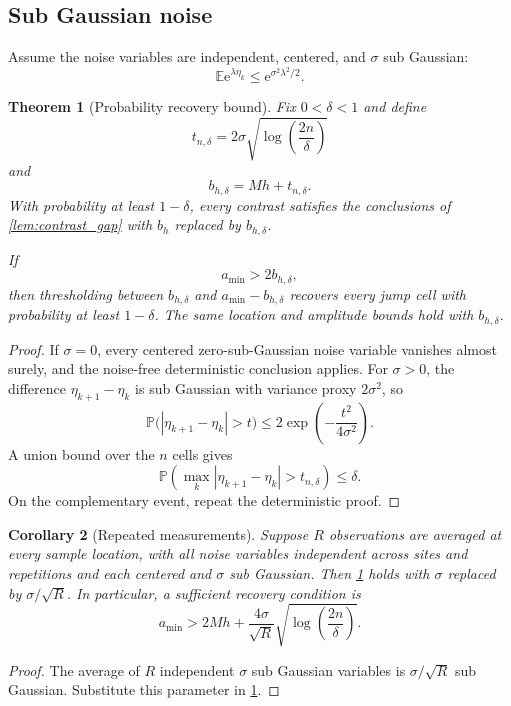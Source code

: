 \documentclass[11pt,a4paper]{article}
\newtheorem{theorem}{Theorem}[section]
\newtheorem{corollary}[theorem]{Corollary}
\theoremstyle{definition}
\theoremstyle{remark}
\newcommand{\e}{\mathrm e}
\begin{document}
\subsection{Sub Gaussian noise}

Assume the noise variables are independent, centered, and \(\sigma\) sub Gaussian:
\[
\mathbb E\e^{\lambda\eta_k}
\leq
\e^{\sigma^2\lambda^2/2}.
\]

\begin{theorem}[Probability recovery bound]\label{thm:probability_recovery}
Fix \(0<\delta<1\) and define
\[
t_{n,\delta}
=
2\sigma
\sqrt{\log\left(\frac{2n}{\delta}\right)}
\]
and
\[
b_{h,\delta}=Mh+t_{n,\delta}.
\]
With probability at least \(1-\delta\), every contrast satisfies the conclusions of \cref{lem:contrast_gap} with \(b_h\) replaced by \(b_{h,\delta}\).

If
\[
a_{\min}>2b_{h,\delta},
\]
then thresholding between \(b_{h,\delta}\) and \(a_{\min}-b_{h,\delta}\) recovers every jump cell with probability at least \(1-\delta\). The same location and amplitude bounds hold with \(b_{h,\delta}\).
\end{theorem}

\begin{proof}
If \(\sigma=0\), every centered zero-sub-Gaussian noise variable vanishes almost surely, and the noise-free deterministic conclusion applies. For \(\sigma>0\), the difference \(\eta_{k+1}-\eta_k\) is sub Gaussian with variance proxy \(2\sigma^2\), so
\[
\mathbb P\bigl(|\eta_{k+1}-\eta_k|>t\bigr)
\leq
2\exp\left(-\frac{t^2}{4\sigma^2}\right).
\]
A union bound over the \(n\) cells gives
\[
\mathbb P\left(
\max_k|\eta_{k+1}-\eta_k|>t_{n,\delta}
\right)
\leq
\delta.
\]
On the complementary event, repeat the deterministic proof.
\end{proof}

\begin{corollary}[Repeated measurements]\label{cor:repeated_measurements}
Suppose \(R\) observations are averaged at every sample location, with all noise variables independent across sites and repetitions and each centered and \(\sigma\) sub Gaussian. Then \cref{thm:probability_recovery} holds with \(\sigma\) replaced by \(\sigma/\sqrt R\). In particular, a sufficient recovery condition is
\[
a_{\min}
>
2Mh+
\frac{4\sigma}{\sqrt R}
\sqrt{\log\left(\frac{2n}{\delta}\right)}.
\]
\end{corollary}

\begin{proof}
The average of \(R\) independent \(\sigma\) sub Gaussian variables is \(\sigma/\sqrt R\) sub Gaussian. Substitute this parameter in \cref{thm:probability_recovery}.
\end{proof}
\end{document}
